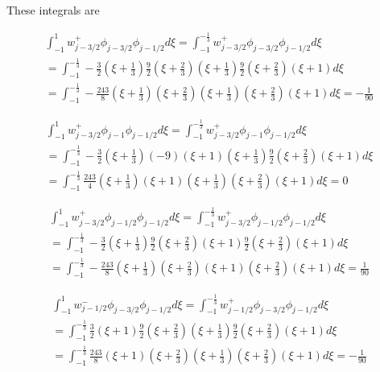 \documentclass[12pt]{article}
\begin{document}
These integrals are 

\begin{multline*}
\int_{-1}^{1} w^+_{j - 3/2} \phi_{j - 3/2} \phi_{j-1/2}d\xi  = \int_{-1}^{-\frac{1}{3}} w^+_{j - 3/2} \phi_{j - 3/2} \phi_{j-1/2}d\xi \\= \int_{-1}^{-\frac{1}{3}} - \frac{3}{2}\left(\xi + \frac{1}{3}\right)\frac{9}{2}\left(\xi + \frac{2}{3}\right)\left(\xi + \frac{1}{3}\right) \frac{9}{2}\left(\xi + \frac{2}{3}\right)\left(\xi + 1\right) d\xi \\= \int_{-1}^{-\frac{1}{3}} - \frac{243}{8}\left(\xi + \frac{1}{3}\right)\left(\xi + \frac{2}{3}\right)\left(\xi + \frac{1}{3}\right)\left(\xi + \frac{2}{3}\right)\left(\xi + 1\right) d\xi = -\frac{1}{90} 
\end{multline*}


\begin{multline*}
\int_{-1}^{1} w^+_{j - 3/2} \phi_{j - 1} \phi_{j-1/2}d\xi  = \int_{-1}^{-\frac{1}{3}} w^+_{j - 3/2} \phi_{j - 1} \phi_{j-1/2}d\xi \\= \int_{-1}^{-\frac{1}{3}} - \frac{3}{2}\left(\xi + \frac{1}{3}\right)(-9)\left(\xi + 1\right)\left(\xi + \frac{1}{3}\right) \frac{9}{2}\left(\xi + \frac{2}{3}\right)\left(\xi + 1\right) d\xi \\= \int_{-1}^{-\frac{1}{3}} \frac{243}{4}\left(\xi + \frac{1}{3}\right)\left(\xi + 1\right)\left(\xi + \frac{1}{3}\right)\left(\xi + \frac{2}{3}\right)\left(\xi + 1\right) d\xi  = 0 
\end{multline*}

\begin{multline*}
\int_{-1}^{1} w^+_{j - 3/2} \phi_{j - 1/2} \phi_{j-1/2}d\xi  = \int_{-1}^{-\frac{1}{3}} w^+_{j - 3/2} \phi_{j - 1/2} \phi_{j-1/2}d\xi \\= \int_{-1}^{-\frac{1}{3}} - \frac{3}{2}\left(\xi + \frac{1}{3}\right)\frac{9}{2}\left(\xi + \frac{2}{3}\right)\left(\xi + 1\right) \frac{9}{2}\left(\xi + \frac{2}{3}\right)\left(\xi + 1\right) d\xi \\= \int_{-1}^{-\frac{1}{3}} -\frac{243}{8}\left(\xi + \frac{1}{3}\right)\left(\xi + \frac{2}{3}\right)\left(\xi + 1\right)\left(\xi + \frac{2}{3}\right)\left(\xi + 1\right) d\xi  = \frac{1}{90} 
\end{multline*}

\begin{multline*}
\int_{-1}^{1} w^-_{j - 1/2} \phi_{j - 3/2} \phi_{j-1/2}d\xi  = \int_{-1}^{-\frac{1}{3}} w^+_{j - 1/2} \phi_{j - 3/2} \phi_{j-1/2}d\xi \\= \int_{-1}^{-\frac{1}{3}}  \frac{3}{2}\left(\xi + 1\right)\frac{9}{2}\left(\xi + \frac{2}{3}\right)\left(\xi + \frac{1}{3}\right) \frac{9}{2}\left(\xi + \frac{2}{3}\right)\left(\xi + 1\right) d\xi \\= \int_{-1}^{-\frac{1}{3}} \frac{243}{8}\left(\xi + 1\right)\left(\xi + \frac{2}{3}\right)\left(\xi + \frac{1}{3}\right)\left(\xi + \frac{2}{3}\right)\left(\xi + 1\right) d\xi = -\frac{1}{90} 
\end{multline*}
\end{document}
